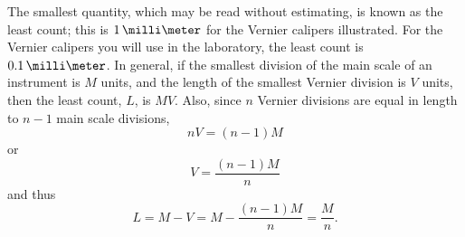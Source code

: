 The smallest quantity, which may be read without estimating, is known as the least count; this is $1\,\milli\meter$ for the Vernier calipers illustrated.  For the Vernier calipers you will use in the laboratory, the least count is $0.1\,\milli\meter$.  In general, if the smallest division of the main scale of an instrument is $M$ units, and the length of the smallest Vernier division is $V$ units, then the least count, $L$, is $M V$. Also, since $n$ Vernier divisions are equal in length to $n-1$ main scale divisions,
\[
   nV = (n-1)M
\]
or
\[
   V = \frac{(n-1)M}{n}
\]
and thus
\[
   L = M - V = M - \frac{(n-1)M}{n} = \frac{M}{n}.
\]
